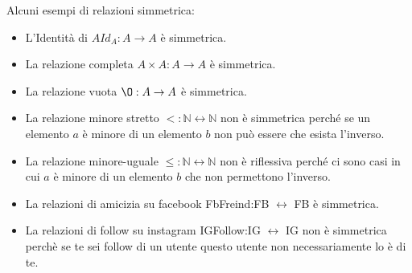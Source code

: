 \begin{example}
Alcuni esempi di relazioni simmetrica:
    \begin{itemize}
        \item L'Identità di $A Id_A: A \rightarrow A$ è simmetrica.
        \item La relazione completa $A \times A:A \rightarrow A$ è simmetrica.
        \item La relazione vuota $\O: A \rightarrow A$ è simmetrica.
        \item La relazione minore stretto $<: \mathbb{N} \longleftrightarrow \mathbb{N}$ non è simmetrica perché se un elemento $a$ è minore di un elemento $b$ non può essere che esista l'inverso.
        \item La relazione minore-uguale $\leq: \mathbb{N} \leftrightarrow \mathbb{N}$ non è riflessiva perché ci sono casi in cui $a$ è minore di un elemento $b$ che non permettono l'inverso.
        \item La relazioni di amicizia su facebook FbFreind:FB $\longleftrightarrow$ FB è simmetrica.
        \item La relazioni di follow su instagram IGFollow:IG $\longleftrightarrow$ IG non è simmetrica perchè se te sei follow di un utente questo utente non necessariamente lo è di te.
    \end{itemize}
\end{example}

